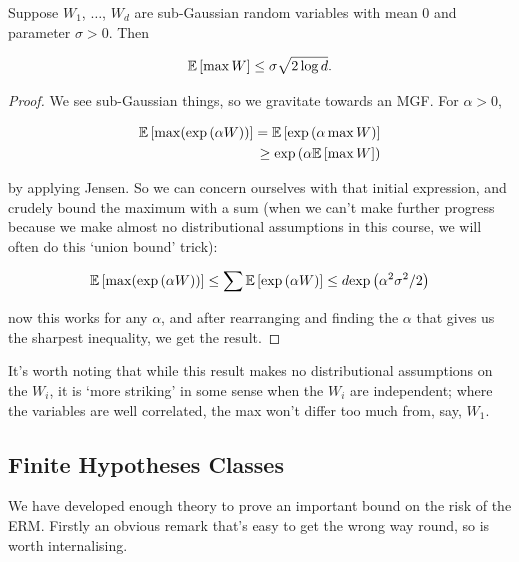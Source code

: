 \documentclass[11pt]{scrartcl}
\begin{document}
\begin{theorem}
\label{max subg upper bound}
Suppose $W_1$, $\dots$, $W_d$ are sub-Gaussian random variables with mean 0 and parameter $\sigma>0$. Then 

\begin{equation}
    \mathbb{E} \left[ \max W \right] \le \sigma \sqrt{2 \log d}.
\end{equation}

\begin{proof}
We see sub-Gaussian things, so we gravitate towards an MGF. For $\alpha > 0$,

\begin{align}
    \mathbb{E} \left[ \max(\text{exp} \left( \alpha W \right)) \right] = \mathbb{E} \left[ \text{exp} \left( \alpha \max W \right) \right] \\
    \ge \text{exp} \left( \alpha \mathbb{E} \left[ \max{W} \right] \right)
\end{align}

by applying Jensen. So we can concern ourselves with that initial expression, and crudely bound the maximum with a sum (when we can't make further progress because we make almost no distributional assumptions in this course, we will often do this `union bound' trick):

\begin{equation}
    \mathbb{E} \left[ \max(\text{exp} \left( \alpha W \right)) \right] \le \sum \mathbb{E} \left[ \text{exp} \left( \alpha W \right) \right] \le d \text{exp} \left( \alpha^2 \sigma^2 / 2 \right)
\end{equation}

now this works for any $\alpha$, and after rearranging and finding the $\alpha$ that gives us the sharpest inequality, we get the result.

\end{proof}
\end{theorem}

It's worth noting that while this result makes no distributional assumptions on the $W_i$, it is `more striking' in some sense when the $W_i$ are independent; where the variables are well correlated, the max won't differ too much from, say, $W_1$.

\subsection{Finite Hypotheses Classes}

We have developed enough theory to prove an important bound on the risk of the ERM. Firstly an obvious remark that's easy to get the wrong way round, so is worth internalising.
\end{document}
